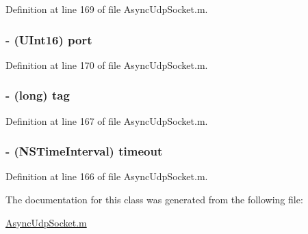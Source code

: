 Definition at line 169 of file AsyncUdpSocket.m.

\hypertarget{interface_async_receive_packet_a96ebf7a8d647c5659f83c9f949dfea88}{
\subsubsection[{port}]{\setlength{\rightskip}{0pt plus 5cm}-\/ (UInt16) {\bf port}}}
\label{interface_async_receive_packet_a96ebf7a8d647c5659f83c9f949dfea88}


Definition at line 170 of file AsyncUdpSocket.m.

\hypertarget{interface_async_receive_packet_ae10c29173f0af40507d7e787905c7130}{
\subsubsection[{tag}]{\setlength{\rightskip}{0pt plus 5cm}-\/ (long) {\bf tag}}}
\label{interface_async_receive_packet_ae10c29173f0af40507d7e787905c7130}


Definition at line 167 of file AsyncUdpSocket.m.

\hypertarget{interface_async_receive_packet_a39233eb85b4cbae04411577510e7c5e6}{
\subsubsection[{timeout}]{\setlength{\rightskip}{0pt plus 5cm}-\/ (NSTimeInterval) {\bf timeout}}}
\label{interface_async_receive_packet_a39233eb85b4cbae04411577510e7c5e6}


Definition at line 166 of file AsyncUdpSocket.m.



The documentation for this class was generated from the following file:\begin{DoxyCompactItemize}
\item 
\hyperlink{_async_udp_socket_8m}{AsyncUdpSocket.m}\end{DoxyCompactItemize}
